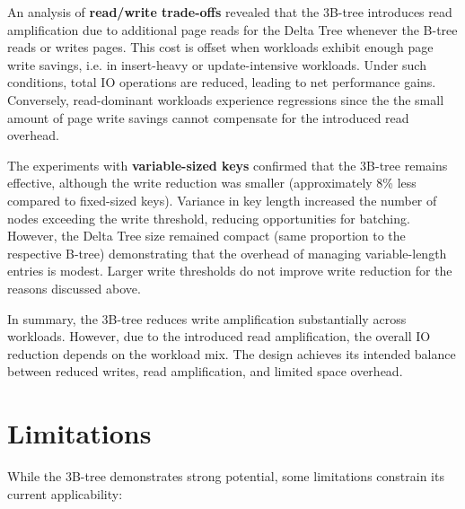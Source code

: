 An analysis of \textbf{read/write trade-offs} revealed that the 3B-tree introduces read amplification due to additional page reads for the Delta Tree whenever the B-tree reads or writes pages.
This cost is offset when workloads exhibit enough page write savings, i.e. in insert-heavy or update-intensive workloads. 
Under such conditions, total \ac{IO} operations are reduced, leading to net performance gains. 
Conversely, read-dominant workloads experience regressions since the the small amount of page write savings cannot compensate for the introduced read overhead.

The experiments with \textbf{variable-sized keys} confirmed that the 3B-tree remains effective, although the write reduction was smaller (approximately 8\% less compared to fixed-sized keys). 
Variance in key length increased the number of nodes exceeding the write threshold, reducing opportunities for batching. 
However, the Delta Tree size remained compact (same proportion to the respective B-tree) demonstrating that the overhead of managing variable-length entries is modest.
Larger write thresholds do not improve write reduction for the reasons discussed above.

In summary, the 3B-tree reduces write amplification substantially across workloads.
However, due to the introduced read amplification, the overall \ac{IO} reduction depends on the workload mix.
The design achieves its intended balance between reduced writes, read amplification, and limited space overhead.

\section{Limitations}
While the 3B-tree demonstrates strong potential, some limitations constrain its current applicability:

